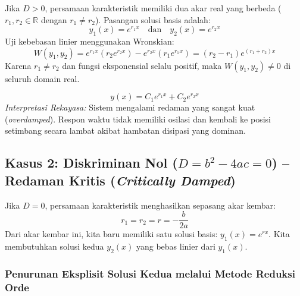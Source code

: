\documentclass[11pt,a4paper]{article}
\theoremstyle{definition}
\begin{document}
Jika $D > 0$, persamaan karakteristik memiliki dua akar real yang berbeda ($r_1, r_2 \in \mathbb{R}$ dengan $r_1 \neq r_2$). Pasangan solusi basis adalah:
\begin{equation}
    y_1(x) = e^{r_1 x} \quad \text{dan} \quad y_2(x) = e^{r_2 x}
\end{equation}
Uji kebebasan linier menggunakan Wronskian:
\begin{equation}
    W(y_1, y_2) = e^{r_1 x}(r_2 e^{r_2 x}) - e^{r_2 x}(r_1 e^{r_1 x}) = (r_2 - r_1) e^{(r_1 + r_2)x}
\end{equation}
Karena $r_1 \neq r_2$ dan fungsi eksponensial selalu positif, maka $W(y_1, y_2) \neq 0$ di seluruh domain real.

\begin{tcolorbox}[colback=green!5!white,colframe=green!60!black,title=\textbf{Solusi Umum Kasus 1 (Akar Real Berbeda)}]
\begin{equation}
    y(x) = C_1 e^{r_1 x} + C_2 e^{r_2 x}
    \label{eq:sol_overdamped}
\end{equation}
\textit{Interpretasi Rekayasa:} Sistem mengalami redaman yang sangat kuat (\textit{overdamped}). Respon waktu tidak memiliki osilasi dan kembali ke posisi setimbang secara lambat akibat hambatan disipasi yang dominan.
\end{tcolorbox}

\subsection{Kasus 2: Diskriminan Nol (\texorpdfstring{$D = b^2 - 4ac = 0$}{D = 0}) -- Redaman Kritis (\textit{Critically Damped})}

Jika $D = 0$, persamaan karakteristik menghasilkan sepasang akar kembar:
\begin{equation}
    r_1 = r_2 = r = -\frac{b}{2a}
\end{equation}
Dari akar kembar ini, kita baru memiliki satu solusi basis: $y_1(x) = e^{rx}$. Kita membutuhkan solusi kedua $y_2(x)$ yang bebas linier dari $y_1(x)$.

\subsubsection{Penurunan Eksplisit Solusi Kedua melalui Metode Reduksi Orde}
\end{document}
